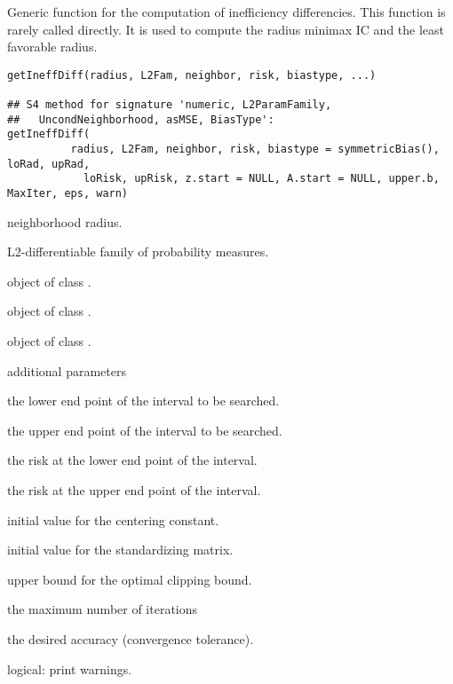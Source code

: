 \begin{Description}\relax
Generic function for the computation of inefficiency differencies.
This function is rarely called directly. It is used to compute
the radius minimax IC and the least favorable radius.
\end{Description}
\begin{Usage}
\begin{verbatim}
getIneffDiff(radius, L2Fam, neighbor, risk, biastype, ...)

## S4 method for signature 'numeric, L2ParamFamily,
##   UncondNeighborhood, asMSE, BiasType':
getIneffDiff(
          radius, L2Fam, neighbor, risk, biastype = symmetricBias(), loRad, upRad, 
            loRisk, upRisk, z.start = NULL, A.start = NULL, upper.b, MaxIter, eps, warn)
\end{verbatim}
\end{Usage}
\begin{Arguments}
\begin{ldescription}
\item[\code{radius}] neighborhood radius. 
\item[\code{L2Fam}] L2-differentiable family of probability measures. 
\item[\code{neighbor}] object of class . 
\item[\code{risk}] object of class . 
\item[\code{biastype}] object of class . 
\item[\code{...}] additional parameters 
\item[\code{loRad}] the lower end point of the interval to be searched. 
\item[\code{upRad}] the upper end point of the interval to be searched. 
\item[\code{loRisk}] the risk at the lower end point of the interval. 
\item[\code{upRisk}] the risk at the upper end point of the interval. 
\item[\code{z.start}] initial value for the centering constant. 
\item[\code{A.start}] initial value for the standardizing matrix. 
\item[\code{upper.b}] upper bound for the optimal clipping bound. 
\item[\code{MaxIter}] the maximum number of iterations 
\item[\code{eps}] the desired accuracy (convergence tolerance).
\item[\code{warn}] logical: print warnings. 
\end{ldescription}
\end{Arguments}
